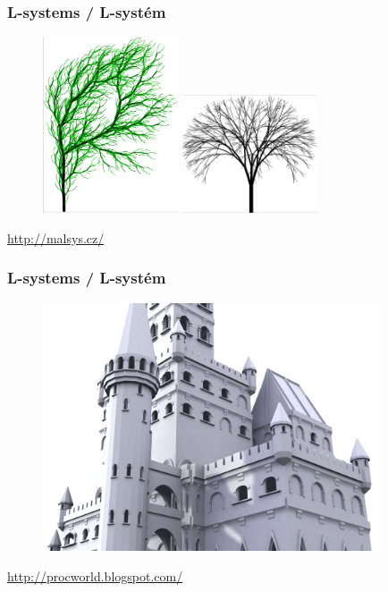 \begin{frame}\frametitle{L-systems / L-systém}
	\begin{figure}[h]
		\includegraphics[width=4cm,keepaspectratio]{pics/procedural/lsystem.jpg}
		\includegraphics[width=4cm,keepaspectratio]{pics/procedural/lsystem1.jpg}
	\end{figure}
	\url{http://malsys.cz/}
\end{frame}

\begin{frame}\frametitle{L-systems / L-systém}
	\begin{figure}[h]
		\includegraphics[width=10cm,keepaspectratio]{pics/procedural/castle.jpg}
	\end{figure}
	\url{http://procworld.blogspot.com/}
\end{frame}

